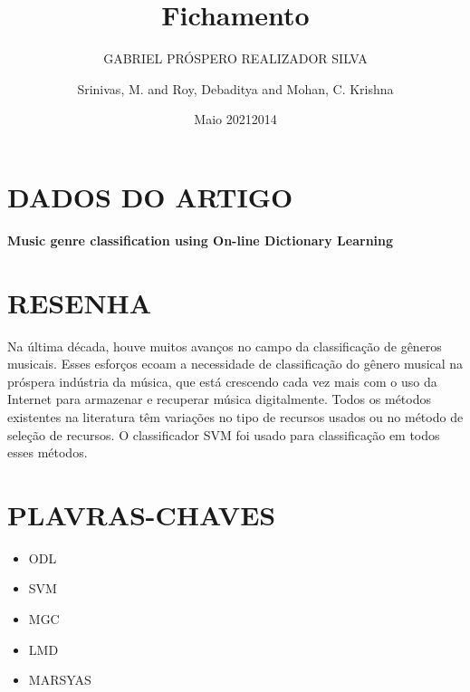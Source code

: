 \documentclass{article}
\title{Fichamento}
\author{GABRIEL PRÓSPERO REALIZADOR  SILVA}
\date{Maio 2021}
\begin{document}
\maketitle

\section{DADOS DO ARTIGO}
\textbf{Music genre classification using On-line Dictionary Learning \\}
\author{Srinivas, M. and Roy, Debaditya and Mohan, C. Krishna \\}
\date{2014}

\section{RESENHA}
Na última década, houve muitos avanços no campo da classificação de gêneros musicais. Esses esforços ecoam a necessidade de classificação do gênero musical na próspera indústria da música, que está crescendo cada vez mais com o uso da Internet para armazenar e recuperar música digitalmente.
Todos os métodos existentes na literatura têm variações no tipo de recursos usados ​​ou no método de seleção de recursos. O classificador SVM foi usado para classificação em todos esses métodos.
\section{PLAVRAS-CHAVES}
\begin{itemize}
    \item ODL
    \item SVM
    \item MGC
    \item LMD
    \item MARSYAS
\end{itemize}
\end{document}
